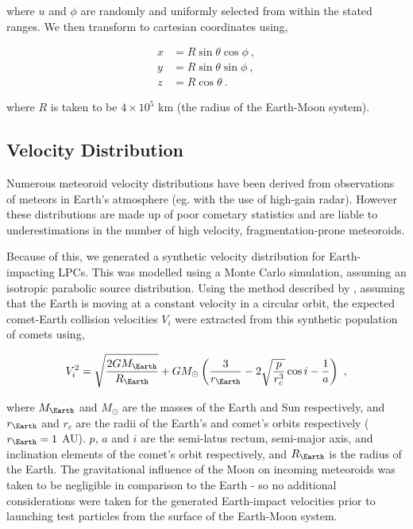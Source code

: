 where $u$ and $\phi$ are randomly and uniformly selected from within the stated ranges. We then transform to cartesian coordinates using,

\begin{equation}
\begin{split}
    x &= R\sin{\theta}\cos{\phi}~, \\
    y &= R\sin{\theta}\sin{\phi}~, \\
    z &= R\cos{\theta}~.
\end{split}
\end{equation}

where $R$ is taken to be $4\times10^5$ km (the radius of the Earth-Moon system). 

\subsection{Velocity Distribution}


Numerous meteoroid velocity distributions have been derived from observations of meteors in Earth's atmosphere (eg. \citep{HUNT200434} with the use of high-gain radar). However these distributions are made up of poor cometary statistics and are liable to underestimations in the number of high velocity, fragmentation-prone meteoroids.

Because of this, we generated a synthetic velocity distribution for Earth-impacting LPCs. This was modelled using a Monte Carlo simulation, assuming an isotropic parabolic source distribution. Using the method described by \cite{2000MNRAS.315..629H}, assuming that the Earth is moving at a constant velocity in a circular orbit, the expected comet-Earth collision velocities $V_i$ were extracted from this synthetic population of comets using,

\begin{equation}
    V_i^2 = \sqrt{\dfrac{2GM_\Earth}{R_\Earth}} + GM_\odot \left(\dfrac{3}{r_\Earth}-2 \sqrt{\dfrac{p}{r_c^3}} \cos i - \dfrac{1}{a}\right) ~,
    \label{eq:im_vel}
\end{equation}

where $M_\Earth$ and $M_\odot$ are the masses of the Earth and Sun respectively, and $r_\Earth$ and $r_c$ are the radii of the Earth's and comet's orbits respectively ($r_\Earth = 1$ AU). $p$, $a$ and $i$ are the semi-latus rectum, semi-major axis, and inclination elements of the comet's orbit respectively, and $R_\Earth$ is the radius of the Earth. The gravitational influence of the Moon on incoming meteoroids was taken to be negligible in comparison to the Earth - so no additional considerations were taken for the generated Earth-impact velocities prior to launching test particles from the surface of the Earth-Moon system.

